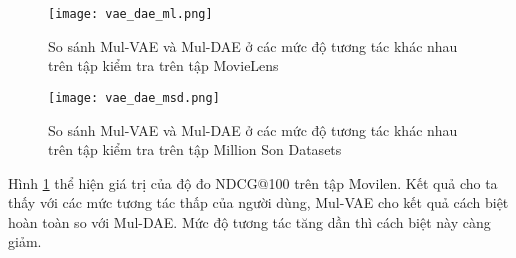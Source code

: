     \begin{figure}
        \centering
        \texttt{[image: vae\_dae\_ml.png]}
        \caption{So sánh Mul-VAE và Mul-DAE ở các mức độ tương tác khác nhau trên tập kiểm tra trên tập MovieLens}
        \label{fig_vae_dae_ml}
    \end{figure}
    \begin{figure}
        \centering
        \texttt{[image: vae\_dae\_msd.png]}
        \caption{So sánh Mul-VAE và Mul-DAE ở các mức độ tương tác khác nhau trên tập kiểm tra trên tập Million Son Datasets}
        \label{fig_vae_dae_msd}
    \end{figure}

    Hình \ref{fig_vae_dae_ml} thể hiện giá trị của độ đo NDCG@100 trên tập Movilen.
    Kết quả cho ta thấy với các mức tương tác thấp của người dùng, Mul-VAE cho kết quả cách biệt hoàn toàn so với Mul-DAE.
    Mức độ tương tác tăng dần thì cách biệt này càng giảm. 


